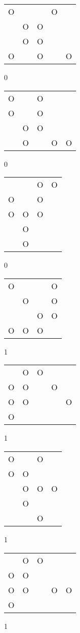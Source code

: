 \begin{tabular}{|m{0.2cm}m{0.2cm}m{0.2cm}m{0.2cm}m{0.2cm}|}\hline
O& & &O& \\
 &O&O& & \\
 &O&O& & \\
O& &O& &O\\
\hline\end{tabular}0
\begin{tabular}{|m{0.2cm}m{0.2cm}m{0.2cm}m{0.2cm}m{0.2cm}|}\hline
O& &O& & \\
O& &O& & \\
 &O&O& & \\
 &O& &O&O\\
\hline\end{tabular}0
\begin{tabular}{|m{0.2cm}m{0.2cm}m{0.2cm}m{0.2cm}|}\hline
 & &O&O\\
O& &O& \\
O&O&O& \\
 &O& & \\
 &O& & \\
\hline\end{tabular}0
\begin{tabular}{|m{0.2cm}m{0.2cm}m{0.2cm}m{0.2cm}|}\hline
O& & &O\\
 &O& &O\\
 & &O&O\\
O&O&O& \\
\hline\end{tabular}1
\begin{tabular}{|m{0.2cm}m{0.2cm}m{0.2cm}m{0.2cm}m{0.2cm}|}\hline
 &O&O& & \\
O&O& &O& \\
O&O& & &O\\
O& & & & \\
\hline\end{tabular}1
\begin{tabular}{|m{0.2cm}m{0.2cm}m{0.2cm}m{0.2cm}|}\hline
O& &O& \\
O&O& & \\
 &O&O&O\\
 &O& & \\
 & &O& \\
\hline\end{tabular}1
\begin{tabular}{|m{0.2cm}m{0.2cm}m{0.2cm}m{0.2cm}m{0.2cm}|}\hline
 &O&O& & \\
O&O& & & \\
O&O& &O&O\\
O& & & & \\
\hline\end{tabular}1
